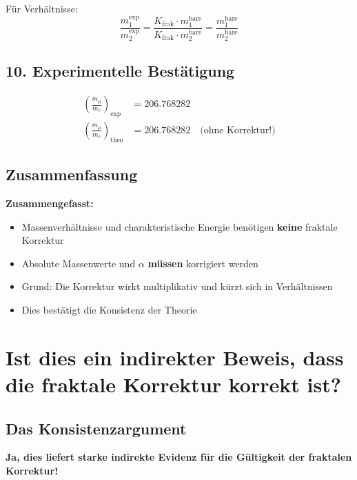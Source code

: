\documentclass[12pt,a4paper]{article}
\begin{document}
Für Verhältnisse:
\[
\frac{m_1^{\text{exp}}}{m_2^{\text{exp}}} = \frac{K_{\text{frak}} \cdot m_1^{\text{bare}}}{K_{\text{frak}} \cdot m_2^{\text{bare}}} = \frac{m_1^{\text{bare}}}{m_2^{\text{bare}}}
\]

\subsection{10. Experimentelle Bestätigung}

\begin{align*}
	\left(\frac{m_\mu}{m_e}\right)_{\text{exp}} &= 206.768282 \\
	\left(\frac{m_\mu}{m_e}\right)_{\text{theo}} &= 206.768282 \quad \text{(ohne Korrektur!)}
\end{align*}

\subsection{Zusammenfassung}

\begin{tcolorbox}[colback=blue!5!white,colframe=blue!75!black]
	\textbf{Zusammengefasst:}
	\begin{itemize}
		\item Massenverhältnisse und charakteristische Energie benötigen \textbf{keine} fraktale Korrektur
		\item Absolute Massenwerte und $\alpha$ \textbf{müssen} korrigiert werden
		\item Grund: Die Korrektur wirkt multiplikativ und kürzt sich in Verhältnissen
		\item Dies bestätigt die Konsistenz der Theorie
	\end{itemize}
\end{tcolorbox}

\section{Ist dies ein indirekter Beweis, dass die fraktale Korrektur korrekt ist?}

\subsection{Das Konsistenzargument}

\begin{tcolorbox}[colback=green!5!white,colframe=green!75!black]
	\textbf{Ja, dies liefert starke indirekte Evidenz für die Gültigkeit der fraktalen Korrektur!}
\end{tcolorbox}
\end{document}
